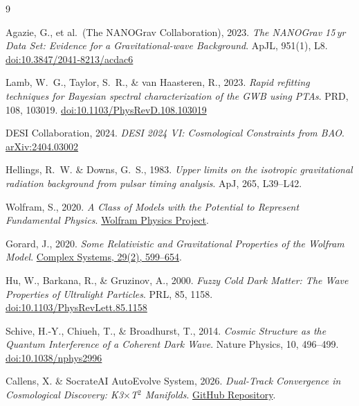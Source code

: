 \documentclass[11pt,a4paper,twocolumn]{article}
\begin{document}
\begin{thebibliography}{9}

Agazie, G., et al.\ (The NANOGrav Collaboration), 2023.
\textit{The NANOGrav 15\,yr Data Set: Evidence for a Gravitational-wave Background}.
ApJL, 951(1), L8.
\href{https://doi.org/10.3847/2041-8213/acdac6}{doi:10.3847/2041-8213/acdac6}

Lamb, W.~G., Taylor, S.~R., \& van Haasteren, R., 2023.
\textit{Rapid refitting techniques for Bayesian spectral characterization of the GWB using PTAs}.
PRD, 108, 103019.
\href{https://doi.org/10.1103/PhysRevD.108.103019}{doi:10.1103/PhysRevD.108.103019}

DESI Collaboration, 2024.
\textit{DESI 2024 VI: Cosmological Constraints from BAO}.
\href{https://arxiv.org/abs/2404.03002}{arXiv:2404.03002}

Hellings, R.~W. \& Downs, G.~S., 1983.
\textit{Upper limits on the isotropic gravitational radiation background from pulsar timing analysis}.
ApJ, 265, L39--L42.

Wolfram, S., 2020.
\textit{A Class of Models with the Potential to Represent Fundamental Physics}.
\href{https://www.wolframphysics.org/technical-introduction/}{Wolfram Physics Project}.

Gorard, J., 2020.
\textit{Some Relativistic and Gravitational Properties of the Wolfram Model}.
\href{https://doi.org/10.25088/ComplexSystems.29.2.599}{Complex Systems, 29(2), 599--654}.

Hu, W., Barkana, R., \& Gruzinov, A., 2000.
\textit{Fuzzy Cold Dark Matter: The Wave Properties of Ultralight Particles}.
PRL, 85, 1158.
\href{https://doi.org/10.1103/PhysRevLett.85.1158}{doi:10.1103/PhysRevLett.85.1158}

Schive, H.-Y., Chiueh, T., \& Broadhurst, T., 2014.
\textit{Cosmic Structure as the Quantum Interference of a Coherent Dark Wave}.
Nature Physics, 10, 496--499.
\href{https://doi.org/10.1038/nphys2996}{doi:10.1038/nphys2996}

Callens, X. \& SocrateAI AutoEvolve System, 2026.
\textit{Dual-Track Convergence in Cosmological Discovery: K3$\times$T$^2$ Manifolds}.
\href{https://github.com/xaviercallens/SocrateAI-Scientific-AutoEvolve-K3xT2}{GitHub Repository}.

\end{thebibliography}
\end{document}
